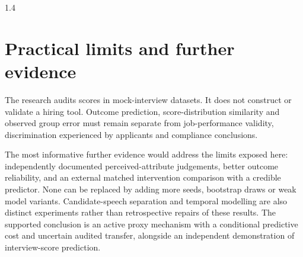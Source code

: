 \begin{spacing}{1.4}
\section{Practical limits and further evidence}

The research audits scores in mock-interview datasets. It does not construct or
validate a hiring tool. Outcome prediction, score-distribution similarity and observed
group error must remain separate from job-performance validity, discrimination
experienced by applicants and compliance conclusions.

The most informative further evidence would address the limits exposed here: independently
documented perceived-attribute judgements, better outcome reliability, and an external
matched intervention comparison with a credible predictor. None can be replaced by
adding more seeds, bootstrap draws or weak model variants. Candidate-speech separation
and temporal modelling are also distinct experiments rather than retrospective repairs
of these results. The supported conclusion is an active proxy mechanism with a
conditional predictive cost and uncertain audited transfer, alongside an independent
demonstration of interview-score prediction.

\end{spacing}
